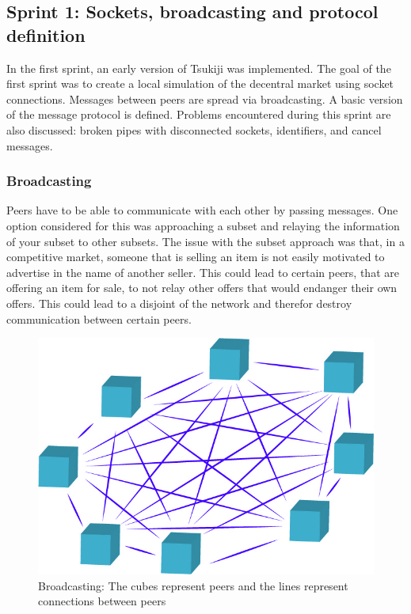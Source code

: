 \subsection{Sprint 1: Sockets, broadcasting and protocol definition}
In the first sprint, an early version of Tsukiji was implemented. The goal of the first sprint was to create a local simulation of the decentral market using socket connections. Messages between peers are spread via broadcasting. A basic version of the message protocol is defined. Problems encountered during this sprint are also discussed: broken pipes with disconnected sockets, identifiers, and cancel messages.

\subsubsection{Broadcasting}
Peers have to be able to communicate with each other by passing messages.
One option considered for this was approaching a subset and relaying the information of your subset to other subsets.
The issue with the subset approach was that, in a competitive market, someone that is selling an item is not easily motivated to advertise in the name of another seller.
This could lead to certain peers, that are offering an item for sale, to not relay other offers that would endanger their own offers.
This could lead to a disjoint of the network and therefor destroy communication between certain peers.
\begin{figure}[H]
  \centering
  \includegraphics[width=\textwidth]{broadcasting}
  \caption{Broadcasting: The cubes represent peers and the lines represent connections between peers}
  \label{broadcastingfig}
\end{figure}


